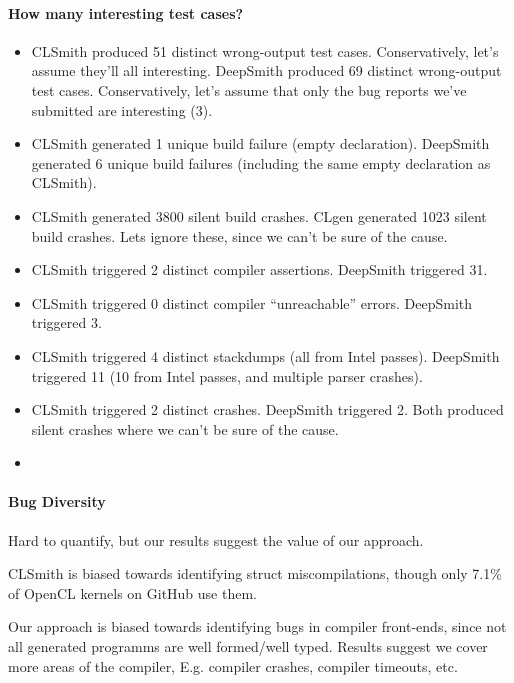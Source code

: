 \paragraph{How many interesting test cases?} 
\begin{itemize}
\item CLSmith produced 51 distinct wrong-output test cases. Conservatively, let's assume they'll all interesting. DeepSmith produced 69 distinct wrong-output test cases. Conservatively, let's assume that only the bug reports we've submitted are interesting (3).
\item CLSmith generated 1 unique build failure (empty declaration). DeepSmith generated 6 unique build failures (including the same empty declaration as CLSmith).
\item CLSmith generated 3800 silent build crashes. CLgen generated 1023 silent build crashes. Lets ignore these, since we can't be sure of the cause.
\item CLSmith triggered 2 distinct compiler assertions. DeepSmith triggered 31.
\item CLSmith triggered 0 distinct compiler ``unreachable'' errors. DeepSmith triggered 3.
\item CLSmith triggered 4 distinct stackdumps (all from Intel passes). DeepSmith triggered 11 (10 from Intel passes, and multiple parser crashes).
\item CLSmith triggered 2 distinct crashes. DeepSmith triggered 2. Both produced silent crashes where we can't be sure of the cause.
\item {}
\end{itemize}

\paragraph{Bug Diversity}

Hard to quantify, but our results suggest the value of our approach.

CLSmith is biased towards identifying struct miscompilations, though only 7.1\% of OpenCL kernels on GitHub use them. 

Our approach is biased towards identifying bugs in compiler front-ends, since not all generated programms are well formed/well typed. Results suggest we cover more areas of the compiler, E.g. compiler crashes, compiler timeouts, etc.

